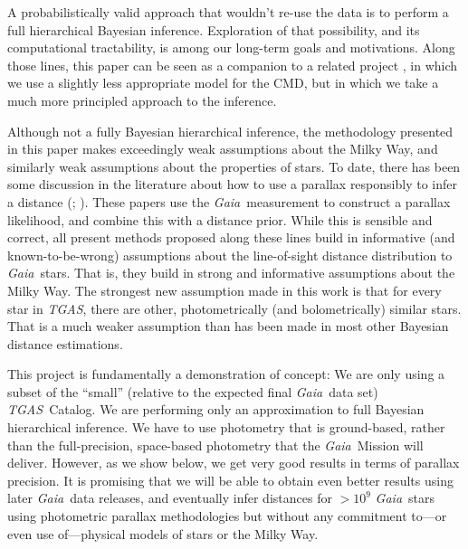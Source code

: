 \documentclass[modern]{aastex61}
\newcommand{\acronym}[1]{{\small{#1}}}
\newcommand{\project}[1]{\textsl{#1}}
\newcommand{\tgas}{\project{\acronym{TGAS}}}
\newcommand{\gaia}{\project{Gaia}}
\newcommand{\cmd}{\acronym{CMD}}
\begin{document}
A probabilistically valid approach that wouldn't re-use the data is to perform
a full hierarchical Bayesian inference.
Exploration of that possibility, and its computational tractability,
is among our long-term goals and motivations.
Along those lines, this paper can be seen as a companion to a related
project \citep{leistedtHogg2017}, in which we use a slightly less appropriate
model for the \cmd, but in which we take a much more principled
approach to the inference.

Although not a fully Bayesian hierarchical inference, the methodology presented in this paper makes exceedingly weak assumptions
about the Milky Way, and similarly weak assumptions about the properties of
stars.
To date, there has been some discussion in the literature
about how to use a parallax responsibly to infer a distance (\citealt{astraatmadja16a}; \citealt{astraatmadja16b}).
These papers use the \gaia\ measurement to construct a parallax likelihood,
and combine this with a distance prior.
While this is sensible and correct, all present methods proposed along
these lines build in informative (and known-to-be-wrong) assumptions
about the line-of-sight distance distribution to \gaia\ stars.
That is, they build in strong and informative assumptions about the Milky
Way.
The strongest new assumption made in this work is that for every star
in \tgas, there are other, photometrically (and bolometrically)
similar stars.
That is a much weaker assumption than has been made in most other Bayesian
distance estimations.

This project is fundamentally a demonstration of concept:
We are only using a subset of the ``small'' (relative to the expected final \gaia\ data set)
\tgas\ Catalog.
We are performing only an approximation to full Bayesian hierarchical inference.
We have to use photometry that is ground-based, rather than the full-precision,
space-based photometry that the \gaia\ Mission will deliver.
However, as we show below, we get very good results in terms of parallax precision.
It is promising that we will be able to obtain even better results
using later \gaia\ data releases, and eventually infer distances for $>10^9$
\gaia\ stars using photometric parallax methodologies but without any
commitment to---or even use of---physical models of stars or the Milky Way.
\end{document}

